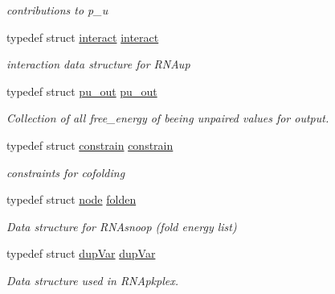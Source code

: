 \begin{DoxyCompactItemize}
\begin{DoxyCompactList}\small\item\em contributions to p\+\_\+u \end{DoxyCompactList}\item 
typedef struct \hyperlink{group__data__structures_structinteract}{interact} \hyperlink{group__data__structures_ga5a052dbe39d3ca1b13932934b13f5263}{interact}\hypertarget{group__data__structures_ga5a052dbe39d3ca1b13932934b13f5263}{}\label{group__data__structures_ga5a052dbe39d3ca1b13932934b13f5263}

\begin{DoxyCompactList}\small\item\em interaction data structure for R\+N\+Aup \end{DoxyCompactList}\item 
typedef struct \hyperlink{group__data__structures_structpu__out}{pu\+\_\+out} \hyperlink{group__data__structures_ga501763bd204b60f40e3ab68b40023023}{pu\+\_\+out}\hypertarget{group__data__structures_ga501763bd204b60f40e3ab68b40023023}{}\label{group__data__structures_ga501763bd204b60f40e3ab68b40023023}

\begin{DoxyCompactList}\small\item\em Collection of all free\+\_\+energy of beeing unpaired values for output. \end{DoxyCompactList}\item 
typedef struct \hyperlink{group__data__structures_structconstrain}{constrain} \hyperlink{group__data__structures_ga212e3afb0cc299acdfb1ec976435686e}{constrain}\hypertarget{group__data__structures_ga212e3afb0cc299acdfb1ec976435686e}{}\label{group__data__structures_ga212e3afb0cc299acdfb1ec976435686e}

\begin{DoxyCompactList}\small\item\em constraints for cofolding \end{DoxyCompactList}\item 
typedef struct \hyperlink{group__data__structures_structnode}{node} \hyperlink{group__data__structures_gaaf402058651c8218fa72788d591cda05}{folden}\hypertarget{group__data__structures_gaaf402058651c8218fa72788d591cda05}{}\label{group__data__structures_gaaf402058651c8218fa72788d591cda05}

\begin{DoxyCompactList}\small\item\em Data structure for R\+N\+Asnoop (fold energy list) \end{DoxyCompactList}\item 
typedef struct \hyperlink{group__data__structures_structdupVar}{dup\+Var} \hyperlink{group__data__structures_gabd3b93f9aaa9f3acce2d148bae97d24e}{dup\+Var}\hypertarget{group__data__structures_gabd3b93f9aaa9f3acce2d148bae97d24e}{}\label{group__data__structures_gabd3b93f9aaa9f3acce2d148bae97d24e}

\begin{DoxyCompactList}\small\item\em Data structure used in R\+N\+Apkplex. \end{DoxyCompactList}\end{DoxyCompactItemize}
